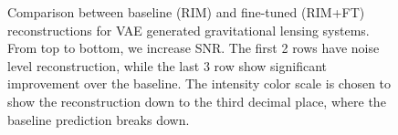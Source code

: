 \begin{figure}[H]
        \centering
        \caption{
        Comparison between baseline (RIM) and fine-tuned (RIM+FT) reconstructions for VAE generated 
        gravitational lensing systems. 
        From top to bottom, we increase SNR. The first 2 
        rows have noise level reconstruction, while the last 3 row show significant improvement 
        over the baseline. The intensity color scale is chosen to show the reconstruction
down to the third decimal place, where the baseline prediction breaks down.}
        \label{fig:increasing SNR}
\end{figure}



